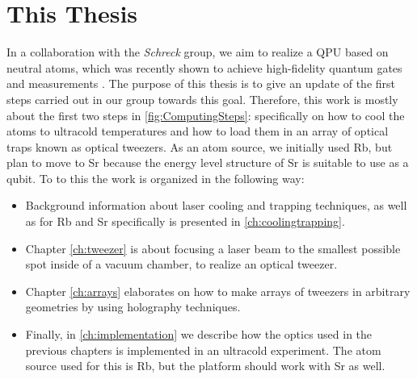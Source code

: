 \section{This Thesis}

In a collaboration with the \textit{Schreck} group, we aim to realize a \ac{QPU} based on neutral atoms, which was recently shown to achieve high-fidelity quantum gates and measurements \cite{Madjarov2020}. 
The purpose of this thesis is to give an update of the first steps carried out in our group towards this goal.
Therefore, this work is mostly about the first two steps in \cref{fig:ComputingSteps}: specifically on how to cool the atoms to ultracold temperatures and how to load them in an array of optical traps known as optical tweezers.
As an atom source, we initially used \ac{Rb}, but plan to move to \ac{Sr} because the energy level structure of Sr is suitable to use as a qubit. 
To to this the work is organized in the following way:

\begin{itemize}
	\setlength\itemsep{-1pt}
	\item Background information about laser cooling and trapping techniques, as well as for Rb and Sr specifically is presented in \cref{ch:coolingtrapping}. 

	\item Chapter \cref{ch:tweezer} is about focusing a laser beam to the smallest possible spot inside of a vacuum chamber, to realize an optical tweezer.

	\item Chapter \ref{ch:arrays} elaborates on how to make arrays of tweezers in arbitrary geometries by using holography techniques.

	\item Finally, in \cref{ch:implementation} we describe how the optics used in the previous chapters is implemented in an ultracold experiment. The atom source used for this is Rb, but the platform should work with Sr as well. 
\end{itemize}










